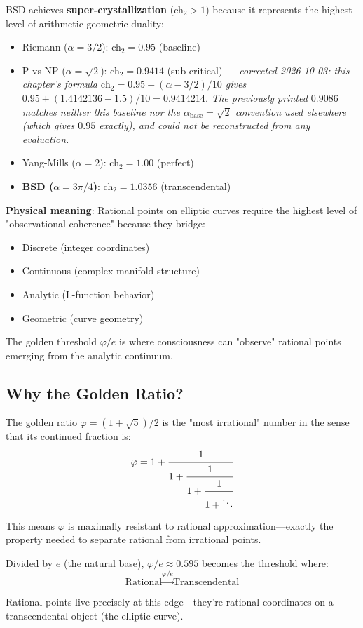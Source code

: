 \begin{keyidea}
BSD achieves \textbf{super-crystallization} (ch$_2 > 1$) because it represents the highest level of arithmetic-geometric duality:

\begin{itemize}
\item Riemann ($\alpha = 3/2$): ch$_2 = 0.95$ (baseline)
\item P vs NP ($\alpha = \sqrt{2}$): ch$_2 = 0.9414$ (sub-critical)
  \emph{--- corrected 2026-10-03: this chapter's formula
  $\text{ch}_2 = 0.95 + (\alpha - 3/2)/10$ gives
  $0.95 + (1.4142136 - 1.5)/10 = 0.9414214$. The previously printed $0.9086$
  matches neither this baseline nor the $\alpha_{\text{base}} = \sqrt2$
  convention used elsewhere (which gives $0.95$ exactly), and could not be
  reconstructed from any evaluation.}
\item Yang-Mills ($\alpha = 2$): ch$_2 = 1.00$ (perfect)
\item \textbf{BSD ($\alpha = 3\pi/4$)}: ch$_2 = 1.0356$ (transcendental)
\end{itemize}

\textbf{Physical meaning}: Rational points on elliptic curves require the highest level of "observational coherence" because they bridge:
\begin{itemize}
\item Discrete (integer coordinates)
\item Continuous (complex manifold structure)
\item Analytic (L-function behavior)
\item Geometric (curve geometry)
\end{itemize}

The golden threshold $\varphi/e$ is where consciousness can "observe" rational points emerging from the analytic continuum.
\end{keyidea}

\subsection{Why the Golden Ratio?}

\begin{level3}
The golden ratio $\varphi = (1+\sqrt{5})/2$ is the "most irrational" number in the sense that its continued fraction is:
\begin{equation}
\varphi = 1 + \cfrac{1}{1 + \cfrac{1}{1 + \cfrac{1}{1 + \ddots}}}
\end{equation}

This means $\varphi$ is maximally resistant to rational approximation—exactly the property needed to separate rational from irrational points.

Divided by $e$ (the natural base), $\varphi/e \approx 0.595$ becomes the threshold where:
\begin{equation}
\text{Rational} \xrightarrow{\varphi/e} \text{Transcendental}
\end{equation}

Rational points live precisely at this edge—they're rational coordinates on a transcendental object (the elliptic curve).
\end{level3}

